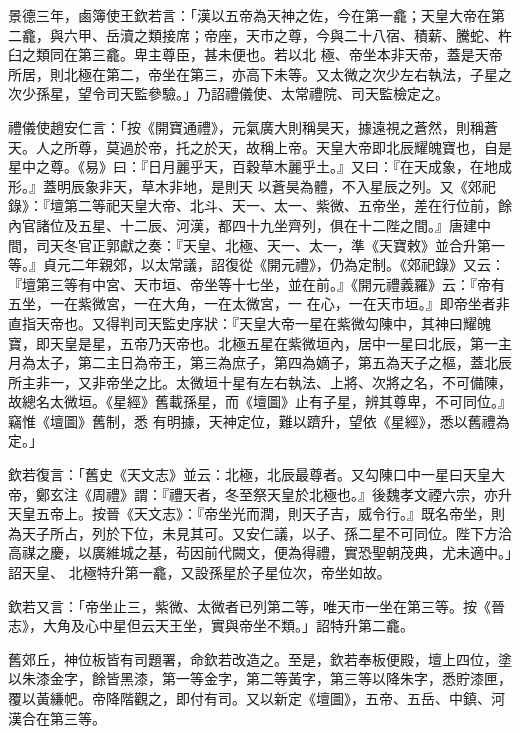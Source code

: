 \begin{pinyinscope}
 景德三年，鹵簿使王欽若言：「漢以五帝為天神之佐，今在第一龕；天皇大帝在第二龕，與六甲、岳瀆之類接席；帝座，天市之尊，今與二十八宿、積薪、騰蛇、杵臼之類同在第三龕。卑主尊臣，甚未便也。若以北
 極、帝坐本非天帝，蓋是天帝所居，則北極在第二，帝坐在第三，亦高下未等。又太微之次少左右執法，子星之次少孫星，望令司天監參驗。」乃詔禮儀使、太常禮院、司天監檢定之。



 禮儀使趙安仁言：「按《開寶通禮》，元氣廣大則稱昊天，據遠視之蒼然，則稱蒼天。人之所尊，莫過於帝，托之於天，故稱上帝。天皇大帝即北辰耀魄寶也，自是星中之尊。《易》曰：『日月麗乎天，百穀草木麗乎土。』又曰：『在天成象，在地成形。』蓋明辰象非天，草木非地，是則天
 以蒼昊為體，不入星辰之列。又《郊祀錄》：『壇第二等祀天皇大帝、北斗、天一、太一、紫微、五帝坐，差在行位前，餘內官諸位及五星、十二辰、河漢，都四十九坐齊列，俱在十二陛之間。』唐建中間，司天冬官正郭獻之奏：『天皇、北極、天一、太一，準《天寶敕》並合升第一等。』貞元二年親郊，以太常議，詔復從《開元禮》，仍為定制。《郊祀錄》又云：『壇第三等有中宮、天市垣、帝坐等十七坐，並在前。』《開元禮義羅》云：『帝有五坐，一在紫微宮，一在大角，一在太微宮，一
 在心，一在天市垣。』即帝坐者非直指天帝也。又得判司天監史序狀：『天皇大帝一星在紫微勾陳中，其神曰耀魄寶，即天皇是星，五帝乃天帝也。北極五星在紫微垣內，居中一星曰北辰，第一主月為太子，第二主日為帝王，第三為庶子，第四為嫡子，第五為天子之樞，蓋北辰所主非一，又非帝坐之比。太微垣十星有左右執法、上將、次將之名，不可備陳，故總名太微垣。《星經》舊載孫星，而《壇圖》止有子星，辨其尊卑，不可同位。』竊惟《壇圖》舊制，悉
 有明據，天神定位，難以躋升，望依《星經》，悉以舊禮為定。」



 欽若復言：「舊史《天文志》並云：北極，北辰最尊者。又勾陳口中一星曰天皇大帝，鄭玄注《周禮》謂：『禮天者，冬至祭天皇於北極也。』後魏孝文禋六宗，亦升天皇五帝上。按晉《天文志》：『帝坐光而潤，則天子吉，威令行。』既名帝坐，則為天子所占，列於下位，未見其可。又安仁議，以子、孫二星不可同位。陛下方洽高禖之慶，以廣維城之基，茍因前代闕文，便為得禮，實恐聖朝茂典，尤未適中。」詔天皇、
 北極特升第一龕，又設孫星於子星位次，帝坐如故。



 欽若又言：「帝坐止三，紫微、太微者已列第二等，唯天市一坐在第三等。按《晉志》，大角及心中星但云天王坐，實與帝坐不類。」詔特升第二龕。



 舊郊丘，神位板皆有司題署，命欽若改造之。至是，欽若奉板便殿，壇上四位，塗以朱漆金字，餘皆黑漆，第一等金字，第二等黃字，第三等以降朱字，悉貯漆匣，覆以黃縑帊。帝降階觀之，即付有司。又以新定《壇圖》，五帝、五岳、中鎮、河漢合在第三等。




\end{pinyinscope}
